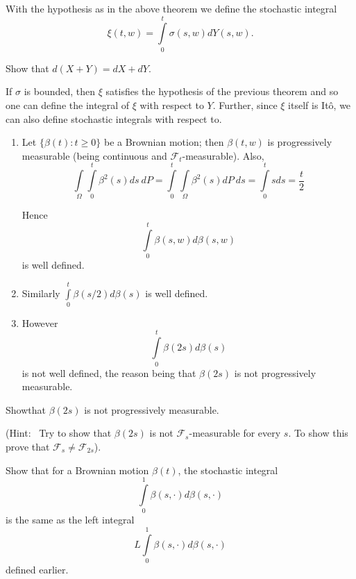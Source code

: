 \begin{defi*}
With the hypothesis as in the above theorem we define the stochastic
integral
$$
\xi(t,w)=\int\limits^{t}_{0}\sigma(s,w)dY(s,w).
$$\pageoriginale
\end{defi*}

\begin{exer*}
Show that $d(X+Y)=dX+dY$.
\end{exer*}

\begin{remark*}
If $\sigma$ is bounded, then $\xi$ satisfies the hypothesis of the
previous theorem and so one can define the integral of $\xi$ with
respect to $Y$. Further, since $\xi$ itself is It\^o, we can also
define stochastic integrals with respect to.
\end{remark*}

\begin{examples*}
\begin{enumerate}
\item
Let $\{\beta(t):t\geq 0\}$ be a Brownian motion; then $\beta(t,w)$ is
progressively measurable (being continuous and
$\mathscr{F}_{t}$-measurable). Also,
$$
\int\limits_{\Omega}\int\limits^{t}_{0}\beta^{2}(s)ds\ dP=\int\limits^{t}_{0}\int\limits_{\Omega}\beta^{2}(s)dP\ ds=\int\limits^{t}_{0}sds=\frac{t}{2}
$$

Hence
$$
\int\limits^{t}_{0}\beta(s,w)d\beta(s,w)
$$
is well defined.

\item Similarly $\int\limits^{t}_{0}\beta(s/2)d\beta(s)$ is well
  defined.

\item However
$$
\int\limits^{t}_{0}\beta(2s)d\beta(s)
$$
is not well defined, the reason being that $\beta(2s)$ is not
progressively measurable.
\end{enumerate}
\end{examples*}

\begin{exercise}\label{chap11-exer5}
Show\pageoriginale that $\beta(2s)$ is not progressively measurable. 

\noindent
(Hint:~ Try to show that $\beta(2s)$ is not
$\mathscr{F}_{s}$-measurable for every $s$. To show this prove that
$\mathscr{F}_{s}\neq \mathscr{F}_{2s}$).
\end{exercise}

\begin{exercise}\label{chap11-exer6}
Show that for a Brownian motion $\beta(t)$, the stochastic integral
$$
\int\limits^{1}_{0}\beta(s,\cdot)d\beta(s,\cdot)
$$
is the same as the left integral
$$
L\int\limits^{1}_{0}\beta(s,\cdot)d\beta(s,\cdot)
$$
defined earlier.
\end{exercise}
